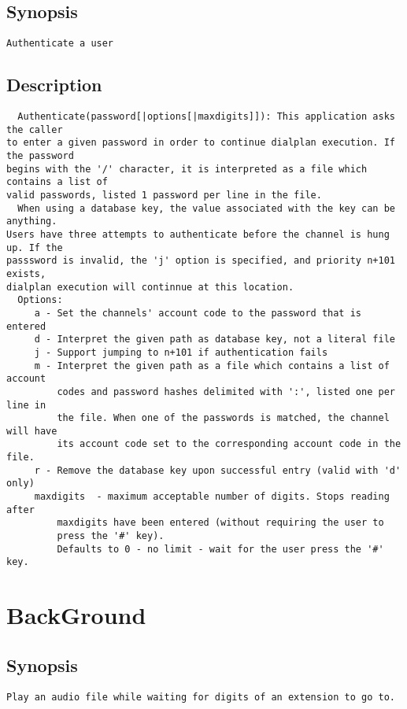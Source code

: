 \subsection{Synopsis}
\begin{verbatim}
Authenticate a user
\end{verbatim}
\subsection{Description}
\begin{verbatim}
  Authenticate(password[|options[|maxdigits]]): This application asks the caller
to enter a given password in order to continue dialplan execution. If the password
begins with the '/' character, it is interpreted as a file which contains a list of
valid passwords, listed 1 password per line in the file.
  When using a database key, the value associated with the key can be anything.
Users have three attempts to authenticate before the channel is hung up. If the
passsword is invalid, the 'j' option is specified, and priority n+101 exists,
dialplan execution will continnue at this location.
  Options:
     a - Set the channels' account code to the password that is entered
     d - Interpret the given path as database key, not a literal file
     j - Support jumping to n+101 if authentication fails
     m - Interpret the given path as a file which contains a list of account
         codes and password hashes delimited with ':', listed one per line in
         the file. When one of the passwords is matched, the channel will have
         its account code set to the corresponding account code in the file.
     r - Remove the database key upon successful entry (valid with 'd' only)
     maxdigits  - maximum acceptable number of digits. Stops reading after
         maxdigits have been entered (without requiring the user to
         press the '#' key).
         Defaults to 0 - no limit - wait for the user press the '#' key.

\end{verbatim}


\section{BackGround}
\subsection{Synopsis}
\begin{verbatim}
Play an audio file while waiting for digits of an extension to go to.
\end{verbatim}
